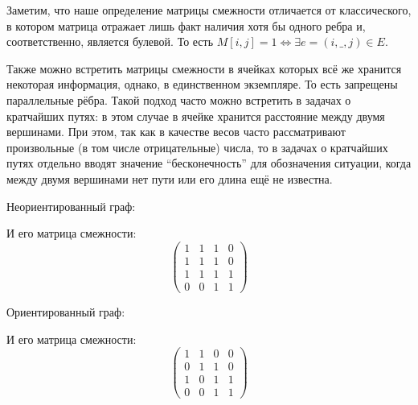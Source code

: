Заметим, что наше определение матрицы смежности отличается от классического, в котором матрица отражает лишь факт наличия хотя бы одного ребра и, соответственно, является булевой. То есть $M[i,j] = 1 \iff \exists e = (i,\_,j) \in E$.


Также можно встретить матрицы смежности в ячейках которых всё же хранится некоторая информация, однако, в единственном экземпляре. То есть запрещены параллельные рёбра.
Такой подход часто можно встретить в задачах о кратчайших путях: в этом случае в ячейке хранится расстояние между двумя вершинами.
При этом, так как в качестве весов часто рассматривают произвольные (в том числе отрицательные) числа, то в задачах о кратчайших путях отдельно вводят значение ``бесконечность'' для обозначения ситуации, когда между двумя вершинами нет пути или его длина ещё не известна.


\begin{example}
  Неориентированный граф:
  \begin{center}
  \end{center}

  И его матрица смежности:
  $$
  \begin{pmatrix}
    1 & 1 & 1 & 0 \\
    1 & 1 & 1 & 0 \\
    1 & 1 & 1 & 1 \\
    0 & 0 & 1 & 1
  \end{pmatrix}
  $$
\end{example}

\begin{example}
  Ориентированный граф:
  \begin{center}
  \end{center}

  И его матрица смежности:
  $$
  \begin{pmatrix}
    1 & 1 & 0 & 0 \\
    0 & 1 & 1 & 0 \\
    1 & 0 & 1 & 1 \\
    0 & 0 & 1 & 1
  \end{pmatrix}
  $$
\end{example}

